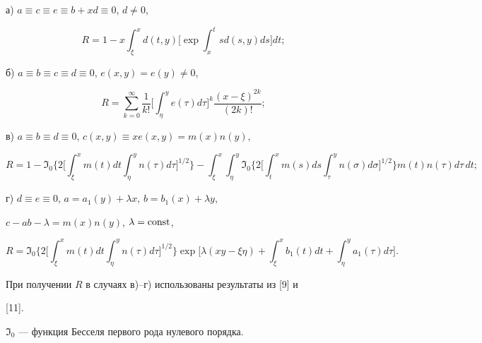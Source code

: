  


а) $a\equiv c\equiv e\equiv b+x d\equiv0$, $d\ne0$,


$$ 


R=1-x\int^x_\xi d(t,y)\bigg[\exp\int^t_x s d(s,y)ds\bigg]dt; 


$$ 


 


б) $a\equiv b\equiv c\equiv d\equiv0$, $e(x,y)=e(y)\ne0$,


$$ 


R=\sum^\infty_{k=0}\frac{1}{k!}\bigg[\int^y_\eta 


e(\tau)d\tau\bigg]^k\frac{(x-\xi)^{2k}}{(2k)!}; 


$$ 


 


в) $a\equiv b\equiv d\equiv0$, $c(x,y)\equiv x e(x,y)=m(x)n(y)$,


$$ 


R=1-\Im_0\bigg\{2\bigg[\int^x_\xi m(t)dt\int^y_\eta n(\tau)d\tau 


\bigg]^{1/2}\bigg\}-\int^x_\xi\int^y_\eta\Im_0\bigg\{2\bigg[ 


\int^x_t m(s)ds\int^y_\tau n(\sigma)d\sigma\bigg]^{1/2}\bigg\} 


m(t)n(\tau)d\tau\,dt; 


$$ 


 


г) $d\equiv e\equiv0$, $a=a_1(y)+\lambda x$, $b=b_1(x)+\lambda y$, 


$c-a b-\lambda=m(x)n(y)$, $\lambda=\operatorname{const}$,


$$ 


R=\Im_0\bigg\{2\bigg[\int^x_\xi m(t)dt\int^y_\eta n(\tau)d\tau 


\bigg]^{1/2}\bigg\}\exp\bigg[\lambda(xy-\xi\eta)


+\int^x_\xi b_1(t)dt+\int^y_\eta a_1(\tau)d\tau\bigg]. 


$$ 


 


При получении $R$ в случаях в)--г) использованы результаты из [9] и 


[11].\; 


$\Im_0$ --- функция Бесселя первого рода нулевого порядка. 


\medskip 


 



